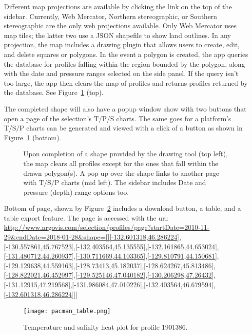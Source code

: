 Different map projections are available by clicking the link on the top of the sidebar. Currently, Web Mercator, Northern stereographic, or Southern stereographic are the only web projections available. Only Web Mercator uses map tiles; the latter two use a JSON shapefile to show land outlines. In any projection, the map includes a drawing plugin that allows users to create, edit, and delete squares or polygons. In the event a polygon is created, the app queries the database for profiles falling within the region bounded by the polygon, along with the date and pressure ranges selected on the side panel. If the query isn't too large, the app then clears the map of profiles and returns profiles returned by the database. See Figure~\ref{fig:heart_sel} (top).

The completed shape will also have a popup window show with two buttons that open a page of the selection's T/P/S charts. The same goes for a platform's T/S/P charts can be generated and viewed with a click of a button as shown in Figure~\ref{fig:heart_sel} (bottom).

\begin{figure}[H]
\caption{\label{fig:heart_sel} Upon completion of a shape provided by the drawing tool (top left), the map clears all profiles except for the ones that fall within the drawn polygon(s). A pop up over the shape links to another page with T/S/P charts (mid left). The sidebar includes Date and pressure (depth) range options too.}
\end{figure}

Bottom of page, shown by Figure~\ref{fig:pacman_table} includes a download button, a table, and a table export feature. The page is accessed with the url: \url{http://www.argovis.com/selection/profiles/page?startDate=2010-11-29&endDate=2018-01-28&shape=[[[-132.601318,46.286224],[-130.557861,45.767523],[-132.403564,45.135555],[-132.161865,44.653024],[-131.480712,44.260937],[-130.711669,44.103365],[-129.810791,44.150681],[-129.129638,44.559163],[-128.73413,45.182037],[-128.624267,45.813486],[-128.822021,46.452997],[-129.525146,47.040182],[-130.206298,47.26432],[-131.12915,47.219568],[-131.986084,47.010226],[-132.403564,46.679594],[-132.601318,46.286224]]]}

\begin{figure}[H]
\begin{minipage}{6in}
\centering
\texttt{[image: pacman\_table.png]}
\caption{\label{fig:pacman_table}Temperature and salinity heat plot for profile 1901386.}
\end{minipage}
\end{figure}

